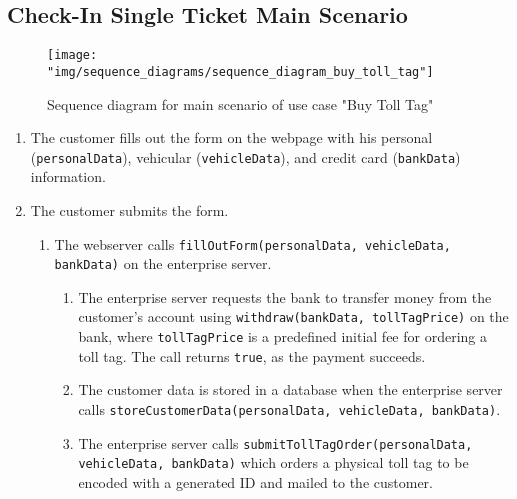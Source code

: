 \subsection{Check-In Single Ticket Main Scenario}

\begin{figure}
\centerline{\texttt{[image: "img/sequence\_diagrams/sequence\_diagram\_buy\_toll\_tag"]}}
\caption{Sequence diagram for main scenario of use case "Buy Toll Tag"}
\label{fig:seq_buy_toll_tag}
\end{figure}

\begin{enumerate}
\item The customer fills out the form on the webpage with his personal (\texttt{personalData}), vehicular (\texttt{vehicleData}), and credit card (\texttt{bankData}) information.
\item The customer submits the form.
	\begin{enumerate}
	\item The webserver calls \texttt{fillOutForm(personalData, vehicleData, bankData)} on the enterprise server.
		\begin{enumerate}
		\item The enterprise server requests the bank to transfer money from the customer's account using \texttt{withdraw(bankData, tollTagPrice)} on the bank, where \texttt{tollTagPrice} is a predefined initial fee for ordering a toll tag. The call returns \texttt{true}, as the payment succeeds.
		\item The customer data is stored in a database when the enterprise server calls \texttt{storeCustomerData(personalData, vehicleData, bankData)}.
		\item The enterprise server calls \texttt{submitTollTagOrder(personalData, vehicleData, bankData)} which orders a physical toll tag to be encoded with a generated ID and mailed to the customer.
		\end{enumerate}
	\end{enumerate}
\end{enumerate}